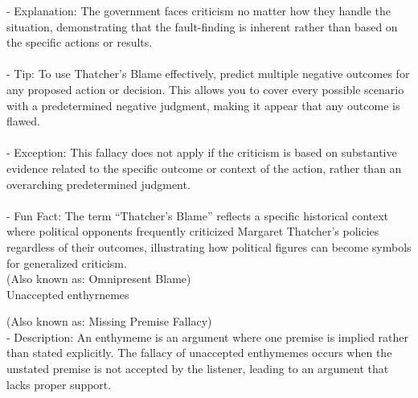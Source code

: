 \documentclass[a4paper,12pt,single,pdftex]{scrbook}
\begin{document}
    
        - Explanation: The government faces criticism no matter how they handle the situation, demonstrating that the fault-finding is inherent rather than based on the specific actions or results.
    \\

    
      
    \\

    
      - Tip: To use Thatcher’s Blame effectively, predict multiple negative outcomes for any proposed action or decision. This allows you to cover every possible scenario with a predetermined negative judgment, making it appear that any outcome is flawed.
    \\

    
      
    \\

    
      - Exception: This fallacy does not apply if the criticism is based on substantive evidence related to the specific outcome or context of the action, rather than an overarching predetermined judgment.
    \\

    
      
    \\

    
      - Fun Fact: The term “Thatcher’s Blame” reflects a specific historical context where political opponents frequently criticized Margaret Thatcher’s policies regardless of their outcomes, illustrating how political figures can become symbols for generalized criticism.
    \\

  
    
      (Also known as: Omnipresent Blame)
    \\

  

Unaccepted enthyrnemes
    
      (Also known as: Missing Premise Fallacy)
    \\

  
    
      - Description: An enthymeme is an argument where one premise is implied rather than stated explicitly. The fallacy of unaccepted enthymemes occurs when the unstated premise is not accepted by the listener, leading to an argument that lacks proper support. 
    \\

    
      
\end{document}
